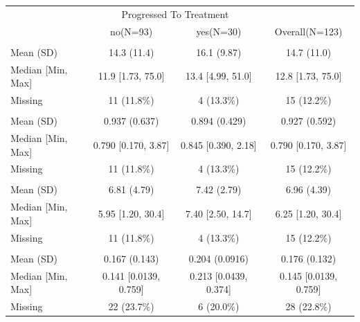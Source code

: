 \documentclass[]{article}
\begin{document}
\begin{tabular}{lccc}
\toprule
\multicolumn{1}{c}{ } & \multicolumn{2}{c}{Progressed To Treatment} & \multicolumn{1}{c}{ } \\
\cmidrule(l{3pt}r{3pt}){2-3}
 & no(N=93) & yes(N=30) & Overall(N=123)\\
\midrule
\addlinespace[0.3em]
\multicolumn{4}{l}{\textbf{[-2]proPSA}}\\
\hspace{1em}Mean (SD) & 14.3 (11.4) & 16.1 (9.87) & 14.7 (11.0)\\
\hspace{1em}Median [Min, Max] & 11.9 [1.73, 75.0] & 13.4 [4.99, 51.0] & 12.8 [1.73, 75.0]\\
\hspace{1em}Missing & 11 (11.8\%) & 4 (13.3\%) & 15 \vphantom{3}(12.2\%)\\
\addlinespace[0.3em]
\multicolumn{4}{l}{\textbf{free PSA}}\\
\hspace{1em}Mean (SD) & 0.937 (0.637) & 0.894 (0.429) & 0.927 (0.592)\\
\hspace{1em}Median [Min, Max] & 0.790 [0.170, 3.87] & 0.845 [0.390, 2.18] & 0.790 [0.170, 3.87]\\
\hspace{1em}Missing & 11 (11.8\%) & 4 (13.3\%) & 15 \vphantom{2}(12.2\%)\\
\addlinespace[0.3em]
\multicolumn{4}{l}{\textbf{PSAHyb}}\\
\hspace{1em}Mean (SD) & 6.81 (4.79) & 7.42 (2.79) & 6.96 (4.39)\\
\hspace{1em}Median [Min, Max] & 5.95 [1.20, 30.4] & 7.40 [2.50, 14.7] & 6.25 [1.20, 30.4]\\
\hspace{1em}Missing & 11 (11.8\%) & 4 (13.3\%) & 15 \vphantom{1}(12.2\%)\\
\addlinespace[0.3em]
\multicolumn{4}{l}{\textbf{PSADensity}}\\
\hspace{1em}Mean (SD) & 0.167 (0.143) & 0.204 (0.0916) & 0.176 (0.132)\\
\hspace{1em}Median [Min, Max] & 0.141 [0.0139, 0.759] & 0.213 [0.0439, 0.374] & 0.145 [0.0139, 0.759]\\
\hspace{1em}Missing & 22 (23.7\%) & 6 (20.0\%) & 28 \vphantom{1}(22.8\%)\\

\end{tabular}
\end{document}
